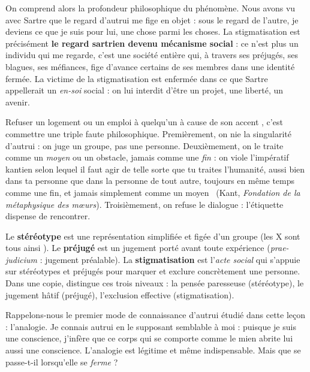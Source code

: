 \documentclass[11pt]{article}
\newcommand{\cle}[1]{{\popxbold\color{popdark}#1}}
\newcounter{popsec}
\newcounter{popsub}
\newcommand{\courssub}[1]{%
  \stepcounter{popsub}%
  \par\vspace{9pt}\noindent{\popxbold\fontsize{11.5}{13}\selectfont\color{popink}{\color{poporange}\thepopsec.\thepopsub}\hspace{6pt}#1}\par\nopagebreak\vspace{4pt}
}
\begin{document}
On comprend alors la profondeur philosophique du phénomène. Nous avons vu avec Sartre que le regard d'autrui me fige en objet : sous le regard de l'autre, je deviens ce que je suis pour lui, une chose parmi les choses. La stigmatisation est précisément \textbf{le regard sartrien devenu mécanisme social} : ce n'est plus un individu qui me regarde, c'est une société entière qui, à travers ses préjugés, ses blagues, ses méfiances, fige d'avance certains de ses membres dans une identité fermée. La victime de la stigmatisation est enfermée dans ce que Sartre appellerait un \emph{en-soi} social : on lui interdit d'être un projet, une liberté, un avenir.

\begin{exemplebox}
Refuser un logement ou un emploi à quelqu'un \guillemotleft à cause de son accent \guillemotright, c'est commettre une triple faute philosophique. Premièrement, on nie la singularité d'autrui : on juge un groupe, pas une personne. Deuxièmement, on le traite comme un \emph{moyen} ou un obstacle, jamais comme une \emph{fin} : on viole l'impératif kantien selon lequel il faut \guillemotleft agir de telle sorte que tu traites l'humanité, aussi bien dans ta personne que dans la personne de tout autre, toujours en même temps comme une fin, et jamais simplement comme un moyen \guillemotright\ (Kant, \emph{Fondation de la métaphysique des mœurs}). Troisièmement, on refuse le dialogue : l'étiquette dispense de rencontrer.
\end{exemplebox}

\begin{attention}
Le \textbf{stéréotype} est une représentation simplifiée et figée d'un groupe (\guillemotleft les X sont tous ainsi \guillemotright). Le \textbf{préjugé} est un jugement porté avant toute expérience (\emph{prae-judicium} : jugement préalable). La \textbf{stigmatisation} est l'\emph{acte social} qui s'appuie sur stéréotypes et préjugés pour marquer et exclure concrètement une personne. Dans une copie, distingue ces trois niveaux : la pensée paresseuse (stéréotype), le jugement hâtif (préjugé), l'exclusion effective (stigmatisation).
\end{attention}

\courssub{Le tribalisme : l'analogie fermée}

Rappelons-nous le premier mode de connaissance d'autrui étudié dans cette leçon : l'\cle{analogie}. Je connais autrui en le supposant semblable à moi : puisque je suis une conscience, j'infère que ce corps qui se comporte comme le mien abrite lui aussi une conscience. L'analogie est légitime et même indispensable. Mais que se passe-t-il lorsqu'elle se \emph{ferme} ?
\end{document}
